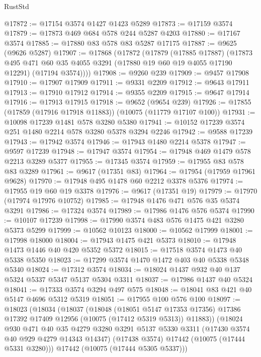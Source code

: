 \begin{lexlean}{RustStd}
\begin{coremodule}
@17872 := @17154 @3574 @1427 @1423 @5289
@17873 := @17159 @3574
@17879 := @17873 @469 @684 @578 @244 @5287 @4203
@17880 := @17167 @3574
@17885 := @17880 @83 @578 @83 @5287 @17175
@17887 := @9625 (@9626 @5287)
@17907 := @17868
    (@17872
      (@17879
        (@17885 @17887)
        (@17873
          @495
          @471
          @60
          @35
          @4055
          @3291
          (@17880 @19 @60 @19 @4055 @17190 @12291)
          (@17194 @3574))))
@17908 := @9260 @239
@17909 := @9457 @17908
@17910 := @17907 @17909
@17911 := @9331 @2209
@17912 := @9643 @17911
@17913 := @17910 @17912
@17914 := @9355 @2209
@17915 := @9647 @17914
@17916 := @17913 @17915
@17918 := @9652 (@9654 @239)
@17926 := @17855 (@17859 (@17916 @17918 @11883)) (@10075 (@11779 @17107 @100))
@17931 := @10098 @17239 @1481 @578 @3280 @5380
@17941 := @10152 @17239 @3574 @251 @1480 @2214 @578 @3280 @5378 @3294 @2246
@17942 := @9588 @17239
@17943 := @17942 @3574
@17946 := @17943 @1480 @2214 @5378
@17947 := @9597 @17239
@17948 := @17947 @3574
@17954 := @17948 @469 @1479 @578 @2213 @3289 @5377
@17955 := @17345 @3574
@17959 := @17955 @83 @578 @83 @3289
@17961 := @9617 (@17351 @83)
@17964 := @17954 (@17959 @17961 @9628)
@17970 := @17948 @495 @1478 @60 @2212 @3378 @5376
@17974 := @17955 @19 @60 @19 @3378
@17976 := @9617 (@17351 @19)
@17979 := @17970 (@17974 @17976 @10752)
@17985 := @17948 @1476 @471 @576 @35 @5374 @3291
@17986 := @17324 @3574
@17989 := @17986 @1476 @576 @5374
@17990 := @10107 @17239
@17998 := @17990 @3574 @483 @576 @1475 @421 @3280 @5373 @5299
@17999 := @10562 @10123
@18000 := @10562 @17999
@18001 := @17998 @18000
@18004 := @17943 @1475 @421 @5373
@18010 := @17948 @1473 @1446 @40 @420 @5352 @5372
@18015 := @17518 @3574 @1473 @40 @5338 @5350
@18023 := @17299 @3574 @1470 @1472 @403 @40 @5338 @5348 @5340
@18024 := @17312 @3574
@18034 := @18024 @1437 @932 @40 @137 @5324 @5337 @5347 @5137 @5304 @3311
@18037 := @17986 @1437 @40 @5324
@18041 := @17333 @3574 @3294 @497 @575
@18048 := @18041 @83 @421 @40 @5147 @4696 @5312 @5319
@18051 := @17955 @100 @576 @100
@18097 := @18023
    (@18034
      (@18037
        (@18048
          (@18051 @5147 @17353 @17356)
          @17386
          @17392
          @17409
          @12956
          (@10075 (@17412 @5319 @5313))
          @11883))
      (@18024
        @930
        @471
        @40
        @35
        @4279
        @3280
        @3291
        @5137
        @5330
        @3311
        (@17430 @3574 @40 @929 @4279 @14343 @14347)
        (@17438 @3574)
        @17442
        (@10075 (@17444 @5331 @3280)))
      @17442
      (@10075 (@17444 @5305 @5337)))

\end{coremodule}
\end{lexlean}
